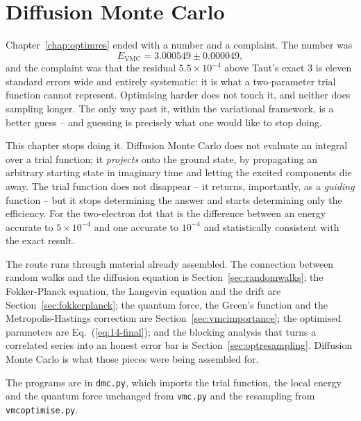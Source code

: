 \chapter{Diffusion Monte Carlo}
\label{chap:dmc}

Chapter~\ref{chap:optimres} ended with a number and a complaint.  The number
was
\begin{equation*}
  E_{\mathrm{VMC}} = 3.000549 \pm 0.000049 ,
\end{equation*}
and the complaint was that the residual $5.5\times10^{-4}$ above Taut's exact
$3$ is eleven standard errors wide and entirely systematic: it is what a
two-parameter trial function cannot represent.  Optimising harder does not
touch it, and neither does sampling longer.  The only way past it, within the
variational framework, is a better guess -- and guessing is precisely what one
would like to stop doing.

This chapter stops doing it.  Diffusion Monte Carlo does not evaluate an
integral over a trial function; it \emph{projects} onto the ground state, by
propagating an arbitrary starting state in imaginary time and letting the
excited components die away.  The trial function does not disappear -- it
returns, importantly, as a \emph{guiding} function -- but it stops determining
the answer and starts determining only the efficiency.  For the two-electron
dot that is the difference between an energy accurate to $5\times10^{-4}$ and
one accurate to $10^{-4}$ and statistically consistent with the exact result.

The route runs through material already assembled.  The connection between
random walks and the diffusion equation is Section~\ref{sec:randomwalks}; the
Fokker-Planck equation, the Langevin equation and the drift are
Section~\ref{sec:fokkerplanck}; the quantum force, the Green's function and
the Metropolis-Hastings correction are Section~\ref{sec:vmcimportance}; the
optimised parameters are Eq.~(\ref{eq:14-final}); and the blocking analysis
that turns a correlated series into an honest error bar is
Section~\ref{sec:optresampling}.  Diffusion Monte Carlo is what those pieces
were being assembled for.

The programs are in \texttt{dmc.py}, which imports the trial function, the
local energy and the quantum force unchanged from \texttt{vmc.py} and the
resampling from \texttt{vmcoptimise.py}.

